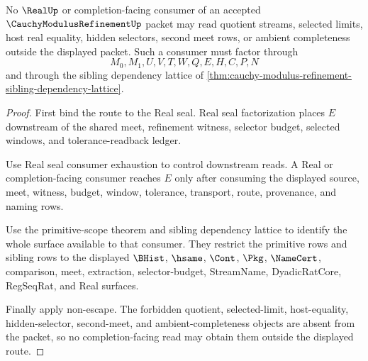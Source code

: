 \begin{theorem}
\label{thm:cauchy-modulus-refinement-completion-boundary}
No $\RealUp$ or completion-facing consumer of an accepted $\CauchyModulusRefinementUp$ packet may read quotient streams, selected limits, host real equality, hidden selectors, second meet rows, or ambient completeness outside the displayed packet. Such a consumer must factor through
$$
M_0,M_1,U,V,T,W,Q,E,H,C,P,N
$$
and through the sibling dependency lattice of \autoref{thm:cauchy-modulus-refinement-sibling-dependency-lattice}.
\end{theorem}
\begin{proof}
First bind the route to the Real seal. Real seal factorization places $E$ downstream of the shared meet, refinement witness, selector budget, selected windows, and tolerance-readback ledger.

Use Real seal consumer exhaustion to control downstream reads. A Real or completion-facing consumer reaches $E$ only after consuming the displayed source, meet, witness, budget, window, tolerance, transport, route, provenance, and naming rows.

Use the primitive-scope theorem and sibling dependency lattice to identify the whole surface available to that consumer. They restrict the primitive rows and sibling rows to the displayed $\BHist$, $\hsame$, $\Cont$, $\Pkg$, $\NameCert$, comparison, meet, extraction, selector-budget, StreamName, DyadicRatCore, RegSeqRat, and Real surfaces.

Finally apply non-escape. The forbidden quotient, selected-limit, host-equality, hidden-selector, second-meet, and ambient-completeness objects are absent from the packet, so no completion-facing read may obtain them outside the displayed route.
\end{proof}


